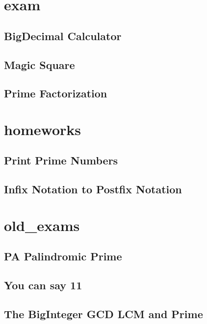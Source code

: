 \section{exam}
    \subsection{BigDecimal Calculator}
            
    \subsection{Magic Square}
        
    \subsection{Prime Factorization}
        

\section{homeworks}
    \subsection{Print Prime Numbers}
            
    \subsection{Infix Notation to Postfix Notation}
        

\section{old_exams}
    \subsection{PA Palindromic Prime}
            
    \subsection{You can say 11}
        
    \subsection{The BigInteger GCD LCM and Prime}
        
